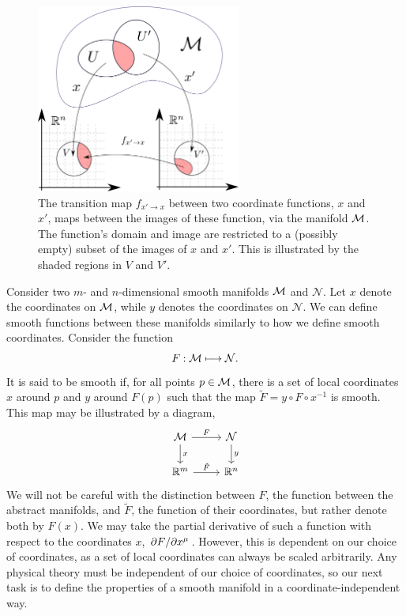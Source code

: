 \begin{figure}[H]
    \centering
    \includegraphics[width=0.6\textwidth]{figurer/transition_map.pdf}
    \caption{
        The transition map $f_{x'\rightarrow x}$ between two coordinate functions, $x$ and $x'$, maps between the images of these function, via the manifold $\mathcal{M}$. 
        The function's domain and image are restricted to a (possibly empty) subset of the images of $x$ and $x'$. This is illustrated by the shaded regions in $V$ and $V'$. 
        }
    \label{fig: transition map}
\end{figure}

Consider two $m$- and $n$-dimensional smooth manifolds $\mathcal{M}$ and $\mathcal N$.
Let $x$ denote the coordinates on $\mathcal{M}$, while $y$ denotes the coordinates on $\mathcal N$.
We can define smooth functions between these manifolds similarly to how we define smooth coordinates.
Consider the function
%
\begin{equation}
    F: \mathcal{M} \longmapsto \mathcal N.
\end{equation}
%
It is said to be smooth if, for all points $p \in\mathcal{M}$, there is a set of local coordinates $x$ around $p$ and $y$ around $F(p)$ such that the map $\tilde F = y \circ F \circ x^{-1}$ is smooth.
This map may be illustrated by a diagram,
%
\begin{equation}
\begin{tikzcd}
    \mathcal M \arrow[d, "x"] \arrow[r, "F"] & \mathcal N \arrow[d, "y"] \\
    \mathbb R^m \arrow[r, "\tilde F"]               & \mathbb R^n              
    \end{tikzcd}
\end{equation}
%
%
We will not be careful with the distinction between $F$, the function between the abstract manifolds, and $\tilde F$, the function of their coordinates, but rather denote both by $F(x)$.
We may take the partial derivative of such a function with respect to the coordinates $x$, $\pdv{F}/{x^\mu}$.
However, this is dependent on our choice of coordinates, as a set of local coordinates can always be scaled arbitrarily.
Any physical theory must be independent of our choice of coordinates, so our next task is to define the properties of a smooth manifold in a coordinate-independent way.


